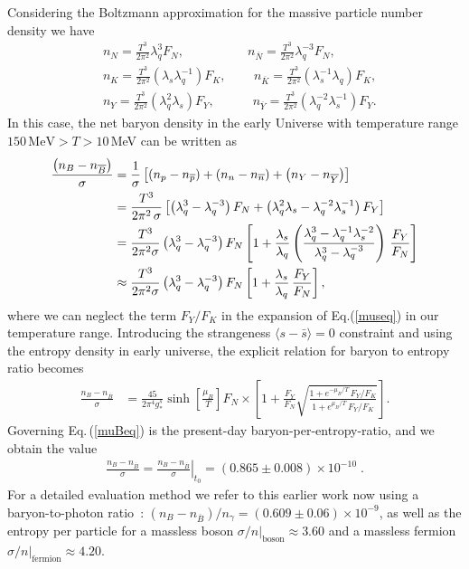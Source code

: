 Considering the Boltzmann approximation for the massive particle number density we have
\begin{align}
\label{Density_N}
&n_N=\frac{T^3}{2\pi^2}\lambda_q^3F_N,\quad\qquad\qquad n_{\overline N}=\frac{T^3}{2\pi^2}\lambda^{-3}_qF_N,\\
\label{Density_K}
&n_K=\frac{T^3}{2\pi^2}\left(\lambda_s\lambda_q^{-1}\right)F_K,\,\qquad n_{\overline{K}}=\frac{T^3}{2\pi^2}\left(\lambda_s^{-1}\lambda_q\right)F_K,\\
\label{Density_Y}
&n_Y=\frac{T^3}{2\pi^2}\left(\lambda_q^2\lambda_s\right)F_Y,\quad\qquad n_{\overline Y}=\frac{T^3}{2\pi^2}\left(\lambda^{-2}_q\lambda_s^{-1}\right)F_Y.
\end{align}
In this case, the net baryon density in the early Universe with temperature range $150\,\mathrm{MeV}> T>10$\,MeV can be written as 
\begin{align}
\frac{\left(n_B-n_{\overline{B}}\right)}{\sigma}&=\frac{1}{\sigma}\left[\left(n_p-n_{\overline{p}}\right)+\left(n_n-n_{\overline{n}}\right)+\left(n_Y-n_{\overline{Y}}\right)\right]\notag\\
&=\frac{T^3}{2\pi^2\,\sigma}\left[\left(\lambda_q^3-\lambda^{-3}_q\right)F_N+\left(\lambda_q^2\lambda_s-\lambda^{-2}_q\lambda_s^{-1}\right)F_Y\right]\notag\\
&=\frac{T^3}{2\pi^2\sigma}\left(\lambda_q^3-\lambda_q^{-3}\right)F_N\left[1+\frac{\lambda_s}{\lambda_q}\left(\frac{\lambda_q^3-\lambda^{-1}_q\lambda_s^{-2}}{\lambda^3_q-\lambda^{-3}_q}\right)\,\frac{F_Y}{F_N}\right]\notag\\
&\approx\frac{T^3}{2\pi^2\sigma}\left(\lambda_q^3-\lambda_q^{-3}\right)F_N\left[1+\frac{\lambda_s}{\lambda_q}\,\frac{F_Y}{F_N}\right],
\end{align}
where we can neglect the term $F_Y/F_K$ in the expansion of Eq.(\ref{museq}) in our temperature range. Introducing the strangeness $\langle s-\bar s\rangle=0$ constraint and using the entropy density in early universe, the explicit relation for baryon to entropy ratio becomes
\begin{align}\label{muBeq}
\frac{n_B-n_{\overline{B}}}{\sigma}&=\frac{45}{2\pi^4g^s_\ast}\sinh\left[\frac{\mu_B}{T}\right]F_N\times\left[1+\frac{F_Y}{F_N}\sqrt{\frac{1+e^{-\mu_B/T}\,F_Y/F_K}{1+e^{\mu_B/T}\,F_Y/F_K}}\right].
\end{align}
Governing Eq.\,(\ref{muBeq}) is the present-day baryon-per-entropy-ratio, and we obtain the value 
\begin{align}\label{BdS}
\frac{n_B-n_{\overline{B}}}{\sigma}= \left.\frac{n_B-n_{\overline{B}}}{ \sigma}\right|_{t_0}=(0.865\pm0.008)\times10^{-10} \;.
\end{align}
For a detailed evaluation method we refer to this earlier work now using a baryon-to-photon ratio~\cite{ParticleDataGroup:2018ovx}: $\left(n_B-n_{\overline{B}}\right)/n_\gamma= (0.609\pm0.06)\times10^{-9}$, as well as the entropy per particle for a massless boson $\sigma/n|_\mathrm{boson}\approx 3.60$ and a massless fermion $\sigma/n|_\mathrm{fermion}\approx 4.20$. 

